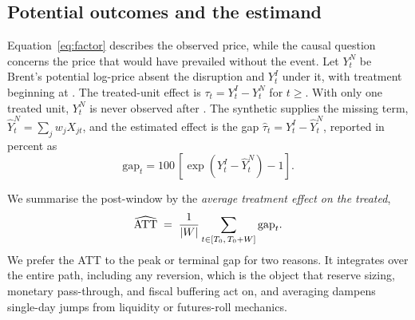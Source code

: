 \subsection{Potential outcomes and the estimand}
Equation~\eqref{eq:factor} describes the observed price, while the causal question
concerns the price that would have prevailed without the event. Let $Y_t^N$ be Brent's
potential log-price absent the disruption and $Y_t^I$ under it, with treatment beginning
at \T{}. The treated-unit effect is $\tau_t=Y_t^I-Y_t^N$ for $t\ge$\T{}. With only one
treated unit, $Y_t^N$ is never observed after \T{}. The synthetic supplies the missing
term, $\hat Y_t^N=\sum_j w_j X_{jt}$, and the estimated effect is the gap
$\hat\tau_t=Y_t^I-\hat Y_t^N$, reported in percent as
\begin{equation}
\text{gap}_t=100\,[\exp(Y_t^I-\hat Y_t^N)-1].
\label{eq:gap}
\end{equation}

We summarise the post-window by the
\emph{average treatment effect on the treated},
\begin{equation}
\widehat{\text{ATT}} \;=\; \frac{1}{|W|}\sum_{t\in[T_0{},\,T_0{}+W]} \text{gap}_t .
\end{equation}
We prefer the ATT to the peak or terminal gap for two reasons. It integrates over the
entire path, including any reversion, which is the object that reserve sizing, monetary
pass-through, and fiscal buffering act on, and averaging dampens single-day jumps from
liquidity or futures-roll mechanics.

